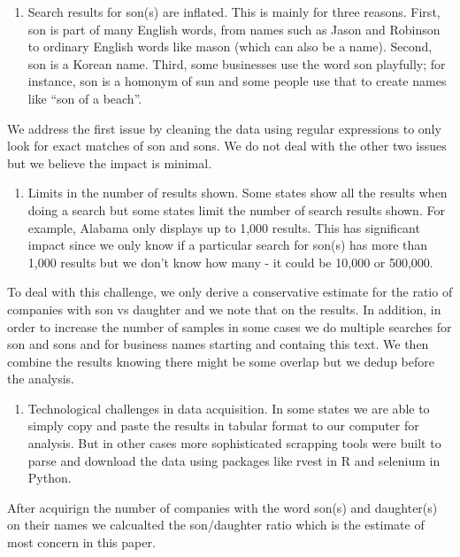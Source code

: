\documentclass[]{article}
\providecommand{\tightlist}{%
  \setlength{\itemsep}{0pt}\setlength{\parskip}{0pt}}
\begin{document}
\begin{enumerate}
\def\labelenumi{\alph{enumi})}
\tightlist
\item
  Search results for son(s) are inflated. This is mainly for three
  reasons. First, son is part of many English words, from names such as
  Jason and Robinson to ordinary English words like mason (which can
  also be a name). Second, son is a Korean name. Third, some businesses
  use the word son playfully; for instance, son is a homonym of sun and
  some people use that to create names like ``son of a beach''.
\end{enumerate}

We address the first issue by cleaning the data using regular
expressions to only look for exact matches of son and sons. We do not
deal with the other two issues but we believe the impact is minimal.

\begin{enumerate}
\def\labelenumi{\alph{enumi})}
\setcounter{enumi}{1}
\tightlist
\item
  Limits in the number of results shown. Some states show all the
  results when doing a search but some states limit the number of search
  results shown. For example, Alabama only displays up to 1,000 results.
  This has significant impact since we only know if a particular search
  for son(s) has more than 1,000 results but we don't know how many - it
  could be 10,000 or 500,000.
\end{enumerate}

To deal with this challenge, we only derive a conservative estimate for
the ratio of companies with son vs daughter and we note that on the
results. In addition, in order to increase the number of samples in some
cases we do multiple searches for son and sons and for business names
starting and containg this text. We then combine the results knowing
there might be some overlap but we dedup before the analysis.

\begin{enumerate}
\def\labelenumi{\alph{enumi})}
\setcounter{enumi}{2}
\tightlist
\item
  Technological challenges in data acquisition. In some states we are
  able to simply copy and paste the results in tabular format to our
  computer for analysis. But in other cases more sophisticated scrapping
  tools were built to parse and download the data using packages like
  rvest in R and selenium in Python.
\end{enumerate}

After acquirign the number of companies with the word son(s) and
daughter(s) on their names we calcualted the son/daughter ratio which is
the estimate of most concern in this paper.
\end{document}
